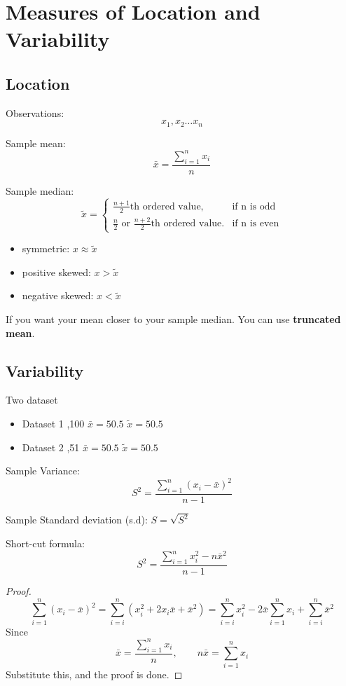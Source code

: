 \section{Measures of Location and Variability}
\subsection{Location}

Observations: \[x_1,x_2 \dots x_n\]

Sample mean:
\[\bar{x}=\frac{\sum_{i=1}^{n} x_i}{n}\]

Sample median:
\[
\tilde{x}=\begin{cases}
\frac{n+1}{2}\text{th ordered value}, &\text{if n is odd}\\
\frac{n}{2}\text{ or }\frac{n+2}{2}\text{th ordered value}. &\text{if n is even}
\end{cases}\]


\begin{itemize}
  \item symmetric: $x\approx \tilde{x}$
  \item positive skewed: $x>\tilde{x}$
  \item negative skewed: $x<\tilde{x}$
\end{itemize}

If you want your mean closer to your sample median. You can use \textbf{truncated mean}.


\subsection{Variability}
\begin{exmp}
Two dataset
  \begin{itemize}
    \item Dataset 1 ,100 \qquad  $\bar{x}=50.5$ \qquad $\tilde{x}=50.5$
    \item Dataset 2 ,51 \qquad  $\bar{x}=50.5$ \qquad $\tilde{x}=50.5$
  \end{itemize}
\end{exmp}


\vspace{4mm}
Sample Variance: \[S^2=\frac{\sum_{i=1}^{n} (x_i-\bar{x})^2}{n-1}\]

Sample Standard deviation (s.d): $S=\sqrt{S^2}$

\vspace{4mm}

Short-cut formula:
\[S^2=\frac{{\sum_{i=1}^{n} x_i^2} - n{\bar{x}}^2}{n-1}
\]
\begin{proof}
\[\sum_{i=1}^{n}(x_i-\bar{x})^2=
\sum_{i=i}^{n}(x_i^2+2x_i\bar{x}+{\bar{x}}^2)=
\sum_{i=i}^{n}x_i^2-2\bar{x}\sum_{i=1}^{n}x_i+
\sum_{i=i}^{n}\bar{x}^2 \]
Since \[\bar{x}=\frac{\sum_{i=1}^{n} x_i}{n}, \qquad n\bar{x}=\sum_{i=1}^{n} x_i \]
Substitute this, and the proof is done. 
\end{proof}

